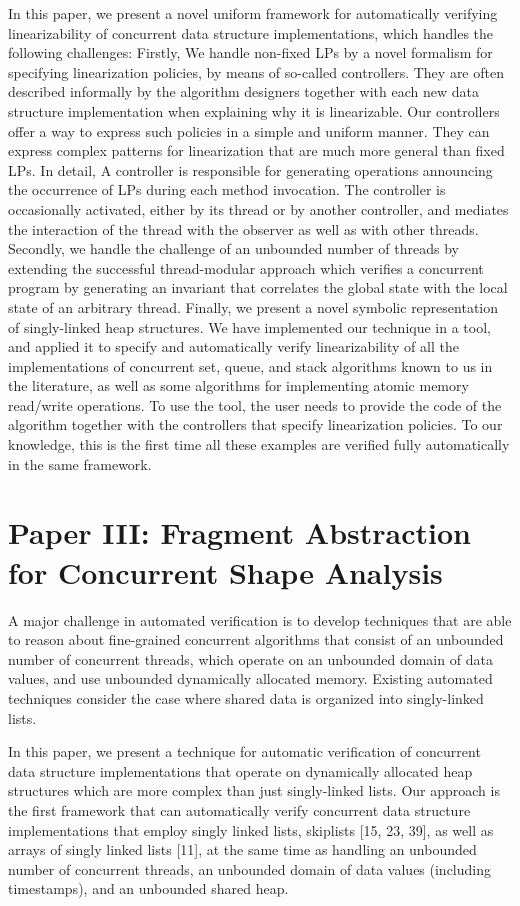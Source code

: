 In this paper, we present a novel uniform framework for automatically
verifying linearizability of concurrent data structure implementations, which handles the following challenges: Firstly, We handle non-fixed LPs by a novel formalism for specifying linearization policies, by means of so-called controllers. They are often described informally by the algorithm designers together with each new data structure implementation when explaining why it is linearizable. Our controllers offer a way to express such policies in a simple and uniform manner. They can express complex patterns for linearization that are much more general than fixed LPs. In detail, A
controller is responsible for generating operations announcing the occurrence of
LPs during each method invocation. The controller is occasionally activated, either by
its thread or by another controller, and mediates the interaction of the thread with the
observer as well as with other threads. Secondly, we handle the challenge of an unbounded number of threads by extending the successful thread-modular approach which verifies a concurrent program by generating an invariant that correlates the global state with the local state of an arbitrary thread. Finally,  we present a novel symbolic representation of singly-linked heap structures.
We have implemented our technique in a tool, and applied it to specify and automatically verify linearizability of all the implementations of concurrent set, queue,
and stack algorithms known to us in the literature, as well as some algorithms for implementing atomic memory read/write operations. To use the tool, the user needs to
provide the code of the algorithm together with the controllers that specify linearization
policies. To our knowledge, this is the first time all these examples are verified fully
automatically in the same framework.
\section{Paper III: Fragment Abstraction for Concurrent Shape Analysis}  
A major challenge in automated verification is to develop techniques
that are able to reason about fine-grained concurrent algorithms that consist of
an unbounded number of concurrent threads, which operate on an unbounded
domain of data values, and use unbounded dynamically allocated memory. Existing automated techniques consider the case where shared data is organized into
singly-linked lists.

In this paper, we present a technique for automatic verification of concurrent data structure implementations that operate on dynamically allocated heap structures which are more complex than just singly-linked lists. Our approach is the first
framework that can automatically verify concurrent data structure implementations that
employ singly linked lists, skiplists [15, 23, 39], as well as arrays of singly linked
lists [11], at the same time as handling an unbounded number of concurrent threads,
an unbounded domain of data values (including timestamps), and an unbounded shared
heap.

